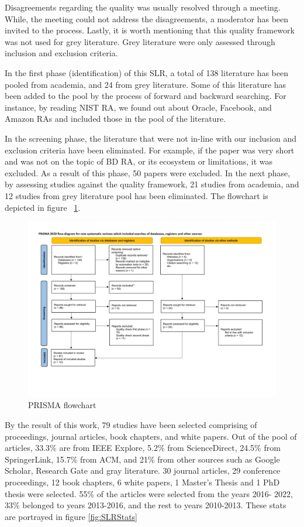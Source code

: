\documentclass{ieeeaccess}
\begin{document}
Disagreements regarding the quality was usually resolved through a meeting. While, the meeting could not address the disagreements, a moderator has been invited to the process. Lastly, it is worth mentioning that this quality framework was not used for grey literature. Grey literature were only assessed through inclusion and exclusion criteria. 

In the first phase (identification) of this SLR, a total of 138 literature has been pooled from academia, and 24 from grey literature. Some of this literature has been added to the pool by the process of forward and backward searching. For instance, by reading NIST RA, we found out about Oracle, Facebook, and Amazon RAs and included those in the pool of the literature.

In the screening phase, the literature that were not in-line with our inclusion and exclusion criteria have been eliminated. For example, if the paper was very short and was not on the topic of BD RA, or its ecosystem or limitations, it was excluded. As a result of this phase, 50 papers were excluded. In the next phase, by assessing studies against the quality framework, 21 studies from academia, and 12 studies from grey literature pool has been eliminated. The flowchart is depicted in figure ~\ref{fig:PRISMA}.


\begin{figure}[t]
    \includegraphics[width=18cm]{PRISMA/PRISMA_Flow_Diagram-Main.pdf}
    \caption{PRISMA flowchart}
    \label{fig:PRISMA}
\end{figure}


By the result of this work, 79 studies have been selected comprising of proceedings, journal articles, book chapters, and white papers. Out of the pool of articles, 33.3\% are from IEEE Explore, 5.2\% from ScienceDirect, 24.5\% from SpringerLink, 15.7\% from ACM, and 21\% from other sources such as Google Scholar, Research Gate and gray literature. 30 journal articles, 29 conference proceedings, 12 book chapters, 6 white papers, 1 Master’s Thesis and 1 PhD thesis were selected. 55\% of the articles were selected from the years 2016- 2022, 33\% belonged to years 2013-2016, and the rest to years 2010-2013. These stats are portrayed in figure \ref{fig:SLRStats}
\end{document}
